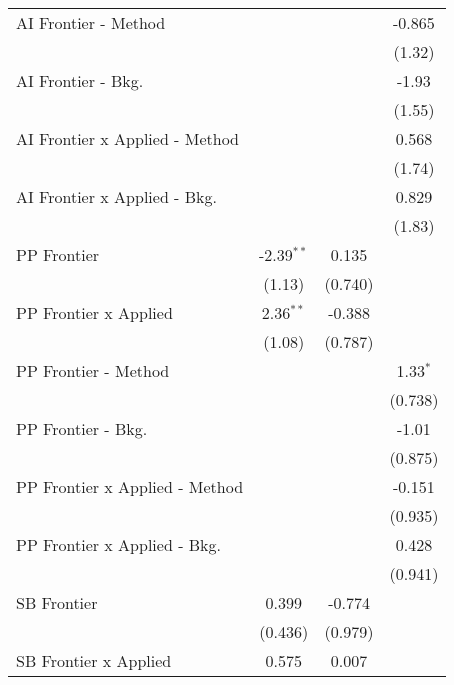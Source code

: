 \begin{tabular}{lccc}
   AI Frontier - Method           &              &             & -0.865\\   
                                  &              &             & (1.32)\\   
   AI Frontier - Bkg.             &              &             & -1.93\\   
                                  &              &             & (1.55)\\   
   AI Frontier x Applied - Method &              &             & 0.568\\   
                                  &              &             & (1.74)\\   
   AI Frontier x Applied - Bkg.   &              &             & 0.829\\   
                                  &              &             & (1.83)\\   
   PP Frontier                    & -2.39$^{**}$ & 0.135       &   \\   
                                  & (1.13)       & (0.740)     &   \\   
   PP Frontier x Applied          & 2.36$^{**}$  & -0.388      &   \\   
                                  & (1.08)       & (0.787)     &   \\   
   PP Frontier - Method           &              &             & 1.33$^{*}$\\   
                                  &              &             & (0.738)\\   
   PP Frontier - Bkg.             &              &             & -1.01\\   
                                  &              &             & (0.875)\\   
   PP Frontier x Applied - Method &              &             & -0.151\\   
                                  &              &             & (0.935)\\   
   PP Frontier x Applied - Bkg.   &              &             & 0.428\\   
                                  &              &             & (0.941)\\   
   SB Frontier                    & 0.399        & -0.774      &   \\   
                                  & (0.436)      & (0.979)     &   \\   
   SB Frontier x Applied          & 0.575        & 0.007       &   \\   

\end{tabular}
